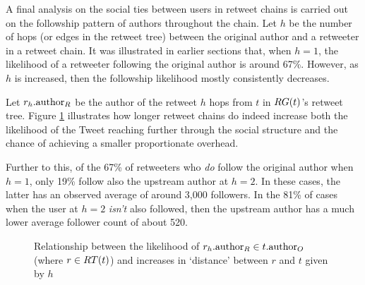 A final analysis on the social ties between users in retweet chains is carried out on the followship pattern of authors throughout the chain. Let $h$ be the number of hops (or edges in the retweet tree) between the original author and a retweeter in a retweet chain. It was illustrated in earlier sections that, when $h = 1$, the likelihood of a retweeter following the original author is around 67\%. However, as $h$ is increased, then the followship likelihood mostly consistently decreases. 

Let $r_h.\textrm{author}_R$ be the author of the retweet $h$ hops from $t$ in $RG(t)$'s retweet tree. Figure \ref{fig:following-possibility} illustrates how longer retweet chains do indeed increase both the likelihood of the Tweet reaching further through the social structure and the chance of achieving a smaller proportionate overhead.

Further to this, of the 67\% of retweeters who \textit{do} follow the original author when $h = 1$, only 19\% follow also the upstream author at $h = 2$. In these cases, the latter has an observed average of around 3,000 followers. In the 81\% of cases when the user at $h = 2$ \textit{isn't} also followed, then the upstream author has a much lower average follower count of about 520.

\begin{figure}[h]
\centering
    \caption{Relationship between the likelihood of $r_h.\textrm{author}_R \in t.\textrm{author}_O$ (where $r \in RT(t)$) and increases in `distance' between $r$ and $t$ given by $h$}
\label{fig:following-possibility}
\end{figure}



